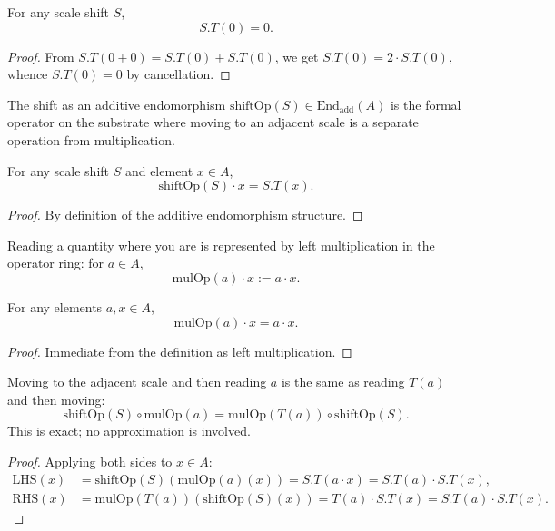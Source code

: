 \begin{theorem}
For any scale shift $S$,
\[
S.T(0) = 0 .
\]
\begin{proof}
From $S.T(0 + 0) = S.T(0) + S.T(0)$, we get $S.T(0) = 2 \cdot S.T(0)$, whence $S.T(0) = 0$ by cancellation.
\end{proof}
\end{theorem}

\begin{definition}
The shift as an additive endomorphism $\text{shiftOp}(S) \in \text{End}_{\text{add}}(A)$ is the formal operator on the substrate where moving to an adjacent scale is a separate operation from multiplication.
\end{definition}

\begin{theorem}
For any scale shift $S$ and element $x \in A$,
\[
\text{shiftOp}(S) \cdot x = S.T(x) .
\]
\begin{proof}
By definition of the additive endomorphism structure.
\end{proof}
\end{theorem}

\begin{definition}
Reading a quantity where you are is represented by left multiplication in the operator ring: for $a \in A$,
\[
\text{mulOp}(a) \cdot x := a \cdot x .
\]
\end{definition}

\begin{theorem}
For any elements $a, x \in A$,
\[
\text{mulOp}(a) \cdot x = a \cdot x .
\]
\begin{proof}
Immediate from the definition as left multiplication.
\end{proof}
\end{theorem}

\begin{theorem}
Moving to the adjacent scale and then reading $a$ is the same as reading $T(a)$ and then moving:
\[
\text{shiftOp}(S) \circ \text{mulOp}(a) = \text{mulOp}(T(a)) \circ \text{shiftOp}(S) .
\]
This is exact; no approximation is involved.
\begin{proof}
Applying both sides to $x \in A$:
\begin{align}
\text{LHS}(x) &= \text{shiftOp}(S)(\text{mulOp}(a)(x)) = S.T(a \cdot x) = S.T(a) \cdot S.T(x) , \\
\text{RHS}(x) &= \text{mulOp}(T(a))(\text{shiftOp}(S)(x)) = T(a) \cdot S.T(x) = S.T(a) \cdot S.T(x) .
\end{align}
\end{proof}
\end{theorem}

